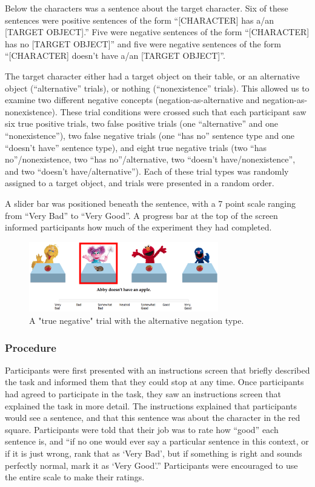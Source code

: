 \documentclass[10pt,letterpaper]{article}
\begin{document}
Below the characters was a sentence about the target character.  Six of these sentences were positive sentences of the form ``[CHARACTER] has a/an [TARGET OBJECT].''  Five were negative sentences of the form ``[CHARACTER] has no [TARGET OBJECT]'' and five were negative sentences of the form ``[CHARACTER] doesn't have a/an [TARGET OBJECT]''.  

The target character either had a target object on their table, or an alternative object (``alternative'' trials), or nothing (``nonexistence'' trials).  This allowed us to examine two different negative concepts (negation-as-alternative and negation-as-nonexistence).  These trial conditions were crossed such that each participant saw six true positive trials, two false positive trials (one ``alternative'' and one ``nonexistence''), two false negative trials (one ``has no'' sentence type and one ``doesn't have'' sentence type), and eight true negative trials (two ``has no''/nonexistence, two ``has no''/alternative, two ``doesn't have/nonexistence'', and two ``doesn't have/alternative'').  Each of these trial types was randomly assigned to a target object, and trials were presented in a random order.

A slider bar was positioned beneath the sentence, with a 7 point scale ranging from ``Very Bad'' to ``Very Good''.  A progress bar at the top of the screen informed participants how much of the experiment they had completed. 

\begin{figure}[t]
\begin{center} 
\includegraphics[width=3.25in]{figures/example.png}
\caption{\label{fig:trial} A "true negative" trial with the alternative negation type.}
\vspace{-5mm}
\end{center} 
\end{figure}

\subsubsection{Procedure}
Participants were first presented with an instructions screen that briefly described the task and informed them that they could stop at any time.  Once participants had agreed to participate in the task, they saw an instructions screen that explained the task in more detail.  The instructions explained that participants would see a sentence, and that this sentence was about the character in the red square.  Participants were told that their job was to rate how ``good'' each sentence is, and ``if no one would ever say a particular sentence in this context, or if it is just wrong, rank that as `Very Bad', but if something is right and sounds perfectly normal, mark it as `Very Good'.''  Participants were encouraged to use the entire scale to make their ratings.
\end{document}
